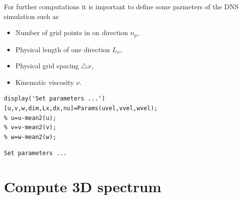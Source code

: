 \documentclass[preprint,12pt,ntfdMod]{elsarticle}
\begin{document}
\begin{par}

For further computations it is important to define some parmeters of the
DNS simulation such as
\begin{itemize}
  \item Number of grid points in on direction $n_{p}$,
  \item Physical length of one direction $L_x$,
  \item Physical grid spacing $\triangle x$,
  \item Kinematic viscosity $\nu$.
\end{itemize}

\end{par} \vspace{1em}
\begin{verbatim}
display('Set parameters ...')
[u,v,w,dim,Lx,dx,nu]=Params(uvel,vvel,wvel);
% u=u-mean2(u);
% v=v-mean2(v);
% w=w-mean2(w);
\end{verbatim}

        \color{lightgray} \begin{verbatim}Set parameters ...
\end{verbatim} \color{black}
    \begin{par}



\end{par} \vspace{1em}


\section{Compute 3D spectrum}
\end{document}
